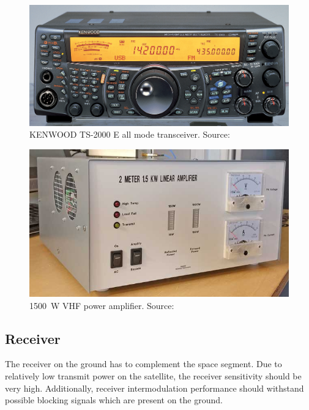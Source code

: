 \begin{minipage}{\linewidth}
    \centering
    \begin{minipage}{0.45\linewidth}
        \begin{figure}[H]
            \centering
            \includegraphics[width=0.35\paperwidth]{img/2/kenwood_ts2000.jpg}
            \caption{KENWOOD TS-2000 E all mode transceiver. Source: \cite{kenwood_ts2000}}
            \label{kenwood_ts2000}
        \end{figure}
    \end{minipage}
    \hspace{0.05\linewidth}
    \begin{minipage}{0.45\linewidth}
        \begin{figure}[H]
            \centering
            \includegraphics[width=0.35\paperwidth]{img/2/vhf_1500w_pa.jpg}
            \caption{\SI{1500}{\watt} VHF power amplifier. Source: \cite{vhf_1500w_pa}}
            \label{vhf_1500w_pa}
        \end{figure}
    \end{minipage}
\end{minipage}

\subsection{Receiver}
The receiver on the ground has to complement the space segment. Due to relatively low transmit power on the satellite, the receiver sensitivity should be very high. Additionally, receiver intermodulation performance should withstand possible blocking signals which are present on the ground.

